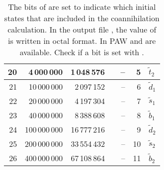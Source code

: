 \begin{table}[!h]
\begin{tabular}{rrrcrrl}
20 &   4\,000\,000 &  1\,048\,576 &&  -- &   5 & $\tilde{t}_2$ \\ \hline
21 &  10\,000\,000 &  2\,097\,152 &&  -- &   6 & $\tilde{d}_1$ \\
22 &  20\,000\,000 &  4\,197\,304 &&  -- &   7 & $\tilde{s}_1$ \\
23 &  40\,000\,000 &  8\,388\,608 &&  -- &   8 & $\tilde{b}_1$ \\
24 & 100\,000\,000 & 16\,777\,216 &&  -- &   9 & $\tilde{d}_2$ \\
25 & 200\,000\,000 & 33\,554\,432 &&  -- &  10 & $\tilde{s}_2$ \\
26 & 400\,000\,000 & 67\,108\,864 &&  -- &  11 & $\tilde{b}_2$ \\ \hline
\end{tabular}
\caption{The bits of  are set to indicate which initial states that
are included in the coannihilation calculation. In the output file , the value of  is written in octal format. In PAW  and  are available. Check if a bit is set with .}
\label{tab:copart}
\end{table}
